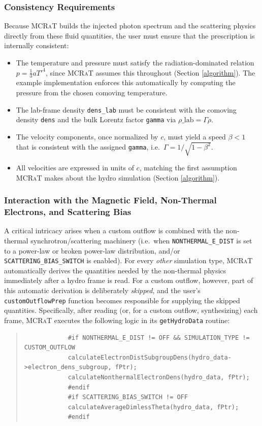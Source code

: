 \documentclass[12pt,a4paper]{article}
\newcommand{\mcrat}{\textsc{MCRaT}}
\begin{document}
\subsubsection{Consistency Requirements}
Because \mcrat{} builds the injected photon spectrum and the scattering physics directly from these fluid quantities, the user must ensure that the prescription is internally consistent:
\begin{itemize}
	\item The temperature and pressure must satisfy the radiation-dominated relation $p=\frac{1}{3}aT'^4$, since \mcrat{} assumes this throughout (Section \ref{algorithm}). The example implementation enforces this automatically by computing the pressure from the chosen comoving temperature.
	\item The lab-frame density \texttt{dens\_lab} must be consistent with the comoving density \texttt{dens} and the bulk Lorentz factor \texttt{gamma} via $\rho\_\mathrm{lab}=\Gamma\rho$.
	\item The velocity components, once normalized by $c$, must yield a speed $\beta<1$ that is consistent with the assigned \texttt{gamma}, i.e.\ $\Gamma=1/\sqrt{1-\beta^2}$.
	\item All velocities are expressed in units of $c$, matching the first assumption \mcrat{} makes about the hydro simulation (Section \ref{algorithm}).
\end{itemize}

\subsubsection{Interaction with the Magnetic Field, Non-Thermal Electrons, and Scattering Bias}\label{custom_outflow_nonthermal}
A critical intricacy arises when a custom outflow is combined with the non-thermal synchrotron/scattering machinery (i.e.\ when \texttt{NONTHERMAL\_E\_DIST} is set to a power-law or broken power-law distribution, and/or \texttt{SCATTERING\_BIAS\_SWITCH} is enabled). For every \emph{other} simulation type, \mcrat{} automatically derives the quantities needed by the non-thermal physics immediately after a hydro frame is read. For a custom outflow, however, part of this automatic derivation is deliberately \emph{skipped}, and the user's \texttt{customOutflowPrep} function becomes responsible for supplying the skipped quantities. Specifically, after reading (or, for a custom outflow, synthesizing) each frame, \mcrat{} executes the following logic in its \texttt{getHydroData} routine:
\begin{quotation}
	{\small
		\begin{verbatim}
			#if NONTHERMAL_E_DIST != OFF && SIMULATION_TYPE != CUSTOM_OUTFLOW
			calculateElectronDistSubgroupDens(hydro_data->electron_dens_subgroup, fPtr);
			calculateNonthermalElectronDens(hydro_data, fPtr);
			#endif
			#if SCATTERING_BIAS_SWITCH != OFF
			calculateAverageDimlessTheta(hydro_data, fPtr);
			#endif
		\end{verbatim}
	}
\end{quotation}
\end{document}
